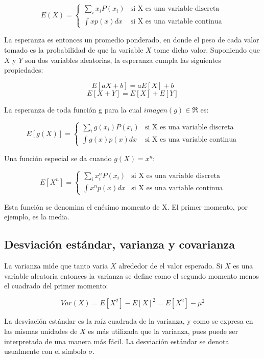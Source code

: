 \documentclass[a4paper, 11pt, oneside]{report}
\begin{document}
	\[ E(X) = \left\{ \begin{array}{ll}
		\sum_{i}{x_iP(x_i)}   & \mbox{si X es una variable discreta} \\
		\int {xp(x)dx} & \mbox{si X es una variable continua}
	\end{array} \right. \]

La esperanza es entonces un promedio ponderado, en donde el peso de cada valor tomado es la probabilidad de que la variable $X$ tome dicho valor. Suponiendo que $X$ y $Y$ son dos variables aleatorias, la esperanza cumpla las siguientes propiedades:

	\[E[aX + b] = aE[X] + b\]
	\[E[X + Y] = E[X] + E[Y]\]

La esperanza de toda función g para la cual $imagen(g) \in \Re$ es:

	\[ E[g(X)] = \left\{ \begin{array}{ll}
		\sum_{i}{g(x_i)P(x_i)}   & \mbox{si X es una variable discreta} \\
		\int {g(x)p(x)dx} & \mbox{si X es una variable continua}
	\end{array} \right. \]

Una función especial se da cuando $g(X) = x^n$:

	\[ E[X^n] = \left\{ \begin{array}{ll}
		\sum_{i}{x_i^nP(x_i)}   & \mbox{si X es una variable discreta} \\
		\int {x^np(x)dx} & \mbox{si X es una variable continua}
	\end{array} \right. \]

Esta función se denomina el enésimo momento de X. El primer momento, por ejemplo, es la media.

\subsection{Desviación estándar, varianza y covarianza}

La varianza mide que tanto varia $X$ alrededor de el valor esperado. Si $X$ es una variable aleatoria entonces la varianza se define como el segundo momento menos el cuadrado del primer momento:

	\[Var(X) = E[X^2] - E[X]^2 = E[X^2] - \mu^2\]

La desviación estándar es la raíz cuadrada de la varianza, y como se expresa en las mismas unidades de $X$ es más utilizada que la varianza, pues puede ser interpretada de una manera más fácil. La desviación estándar se denota usualmente con el símbolo $\sigma$.
\end{document}
